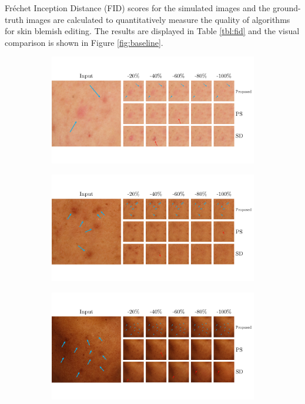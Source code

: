 \begin{spacing}{1.5}
Fréchet Inception Distance (FID) scores for the simulated images and the ground-truth images are calculated to quantitatively measure the quality of algorithms for skin blemish editing. The results are displayed in Table \ref{tbl:fid} and the visual comparison is shown in Figure \ref{fig:baseline}.
\begin{figure}[t!]
    \centering
    \begin{subfigure}{\textwidth}
        \centering
        \includegraphics[width=\linewidth]{Chapter5/baseline/baseline41.pdf}
    \end{subfigure}
    \hfill
    \begin{subfigure}{\textwidth}
        \centering
        \includegraphics[width=\linewidth]{Chapter5/baseline/baseline42.pdf}
    \end{subfigure}
    \hfill
    \begin{subfigure}{\textwidth}
        \centering
        \includegraphics[width=\linewidth]{Chapter5/baseline/baseline43.pdf}

\end{subfigure}
\end{figure}
\end{spacing}
